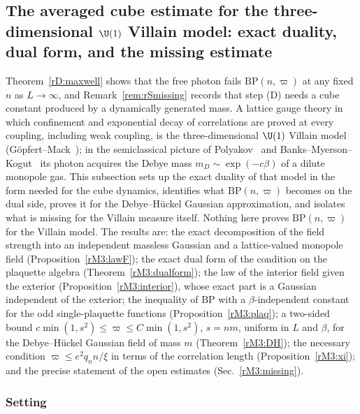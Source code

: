 \subsection{The averaged cube estimate for the three-dimensional
$\U(1)$ Villain model: exact duality, dual form, and the missing
estimate}\label{rM3:sec}

Theorem~\ref{rD:maxwell} shows that the free photon fails
$\mathrm{BP}(n,\varpi)$ at any fixed $n$ as $L\to\infty$, and
Remark~\ref{rem:rSmissing} records that step (D) needs a cube constant
produced by a dynamically generated mass. A lattice gauge theory in
which confinement and exponential decay of correlations are proved at
every coupling, including weak coupling, is the three-dimensional $\U(1)$
Villain model (G\"opfert--Mack~\cite{GM82}); in the semiclassical picture
of Polyakov~\cite{Pol77} and Banks--Myerson--Kogut~\cite{BMK77} its photon
acquires the Debye mass $m_D\sim\exp(-c\beta)$ of a dilute monopole gas.
This subsection sets up the exact duality of that model in the form needed
for the cube dynamics, identifies what $\mathrm{BP}(n,\varpi)$ becomes on
the dual side, proves it for the Debye--H\"uckel Gaussian approximation,
and isolates what is missing for the Villain measure itself. Nothing here
proves $\mathrm{BP}(n,\varpi)$ for the Villain model. The results are: the
exact decomposition of the field strength into an independent massless
Gaussian and a lattice-valued monopole field
(Proposition~\ref{rM3:lawF}); the exact dual form of the condition on the
plaquette algebra (Theorem~\ref{rM3:dualform}); the law of the interior
field given the exterior (Proposition~\ref{rM3:interior}), whose exact
part is a Gaussian independent of the exterior; the inequality of
$\mathrm{BP}$ with a $\beta$-independent constant for the odd
single-plaquette functions (Proposition~\ref{rM3:plaq}); a two-sided bound
$c\min(1,s^2)\le\varpi\le C\min(1,s^2)$, $s=nm$, uniform in $L$ and
$\beta$, for the Debye--H\"uckel Gaussian field of mass $m$
(Theorem~\ref{rM3:DH}); the
necessary condition $\varpi\le e^2q_nn/\xi$ in terms of the correlation
length (Proposition~\ref{rM3:xi}); and the precise statement of the open
estimates (Sec.~\ref{rM3:missing}).

\subsubsection{Setting}\label{rM3:setting}


